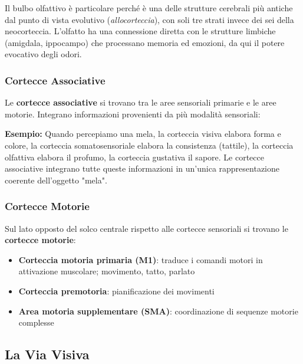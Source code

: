 Il bulbo olfattivo è particolare perché è una delle strutture cerebrali più antiche dal punto di vista evolutivo (\textit{allocorteccia}), con soli tre strati invece dei sei della neocorteccia. L'olfatto ha una connessione diretta con le strutture limbiche (amigdala, ippocampo) che processano memoria ed emozioni, da qui il potere evocativo degli odori.


\subsubsection{Cortecce Associative}

Le \textbf{cortecce associative} si trovano tra le aree sensoriali primarie e le aree motorie. Integrano informazioni provenienti da più modalità sensoriali:

\begin{tcolorbox}[colback=gray!5, colframe=gray!40, arc=2mm, boxrule=0.5pt]
\textbf{Esempio:} Quando percepiamo una mela, la corteccia visiva elabora forma e colore, la corteccia somatosensoriale elabora la consistenza (tattile), la corteccia olfattiva elabora il profumo, la corteccia gustativa il sapore. Le cortecce associative integrano tutte queste informazioni in un'unica rappresentazione coerente dell'oggetto "mela".
\end{tcolorbox}

\subsubsection{Cortecce Motorie}

Sul lato opposto del solco centrale rispetto alle cortecce sensoriali si trovano le \textbf{cortecce motorie}:

\begin{itemize}
    \item \textbf{Corteccia motoria primaria (M1)}: traduce i comandi motori in attivazione muscolare; movimento, tatto, parlato
    \item \textbf{Corteccia premotoria}: pianificazione dei movimenti
    \item \textbf{Area motoria supplementare (SMA)}: coordinazione di sequenze motorie complesse
\end{itemize}




\subsection{La Via Visiva}

